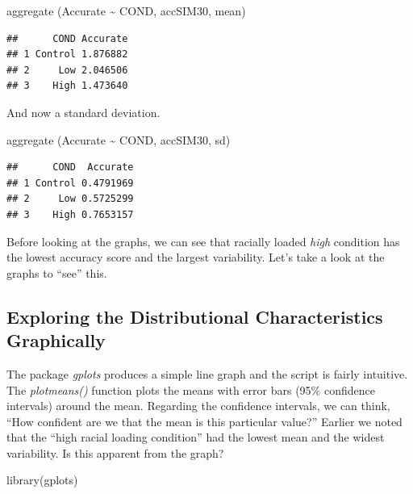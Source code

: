 \documentclass[
  english,
]{book}
\newenvironment{Shaded}{\begin{snugshade}}{\end{snugshade}}
\newcommand{\FunctionTok}[1]{\textcolor[rgb]{0.00,0.00,0.00}{#1}}
\newcommand{\NormalTok}[1]{#1}
\newcommand{\SpecialCharTok}[1]{\textcolor[rgb]{0.00,0.00,0.00}{#1}}
\begin{document}
\begin{Shaded}
\begin{Highlighting}[]
\FunctionTok{aggregate}\NormalTok{ (Accurate }\SpecialCharTok{\textasciitilde{}}\NormalTok{ COND, accSIM30, mean)}
\end{Highlighting}
\end{Shaded}

\begin{verbatim}
##      COND Accurate
## 1 Control 1.876882
## 2     Low 2.046506
## 3    High 1.473640
\end{verbatim}

And now a standard deviation.

\begin{Shaded}
\begin{Highlighting}[]
\FunctionTok{aggregate}\NormalTok{ (Accurate }\SpecialCharTok{\textasciitilde{}}\NormalTok{ COND, accSIM30, sd)}
\end{Highlighting}
\end{Shaded}

\begin{verbatim}
##      COND  Accurate
## 1 Control 0.4791969
## 2     Low 0.5725299
## 3    High 0.7653157
\end{verbatim}

Before looking at the graphs, we can see that racially loaded \emph{high} condition has the lowest accuracy score and the largest variability. Let's take a look at the graphs to ``see'' this.

\hypertarget{exploring-the-distributional-characteristics-graphically}{%
\subsection{Exploring the Distributional Characteristics Graphically}\label{exploring-the-distributional-characteristics-graphically}}

The package \emph{gplots} produces a simple line graph and the script is fairly intuitive. The \emph{plotmeans()} function plots the means with error bars (95\% confidence intervals) around the mean. Regarding the confidence intervals, we can think, ``How confident are we that the mean is this particular value?'' Earlier we noted that the ``high racial loading condition'' had the lowest mean and the widest variability. Is this apparent from the graph?

\begin{Shaded}
\begin{Highlighting}[]
\FunctionTok{library}\NormalTok{(gplots)}
\end{Highlighting}
\end{Shaded}
\end{document}
